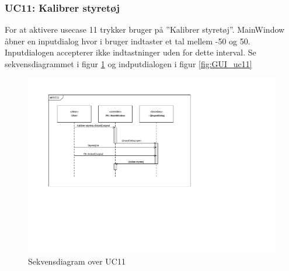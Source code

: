 \subsubsection{UC11: Kalibrer styretøj}
For at aktivere usecase 11 trykker bruger på ''Kalibrer styretøj''.
MainWindow åbner en inputdialog hvor i bruger indtaster et tal mellem -50 og 50. Inputdialogen accepterer ikke indtastninger uden for dette interval. Se sekvensdiagrammet i figur \ref{fig:cd_uc11} og indputdialogen i figur \ref{fig:GUI_uc11}

\begin{figure}[H]
\centering
\includegraphics[width=\textwidth* 2/3,height=\textwidth* 4/10 ]{../fig/diagrammer/pc/sd_uc11.pdf}
\caption{Sekvensdiagram over UC11}
\label{fig:cd_uc11}
\end{figure}

